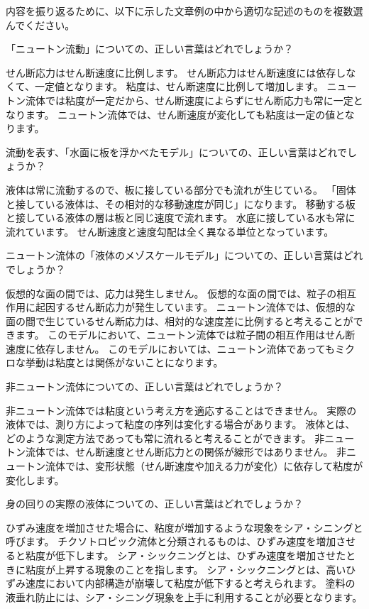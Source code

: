 \documentclass[uplatex,dvipdfmx,a4paper,11pt]{jsreport}
\begin{document}
内容を振り返るために、以下に示した文章例の中から適切な記述のものを複数選んでください。
\begin{qlist}
	\qitem 「ニュートン流動」についての、正しい言葉はどれでしょうか？
		\begin{qlist2}
			\qitem せん断応力はせん断速度に比例します。
			\qitem せん断応力はせん断速度には依存しなくて、一定値となります。
			\qitem 粘度は、せん断速度に比例して増加します。
			\qitem ニュートン流体では粘度が一定だから、せん断速度によらずにせん断応力も常に一定となります。
			\qitem ニュートン流体では、せん断速度が変化しても粘度は一定の値となります。
		\end{qlist2}
	\qitem 流動を表す、「水面に板を浮かべたモデル」についての、正しい言葉はどれでしょうか？
		\begin{qlist2}
			\qitem 液体は常に流動するので、板に接している部分でも流れが生じている。
			\qitem 「固体と接している液体は、その相対的な移動速度が同じ」になります。
			\qitem 移動する板と接している液体の層は板と同じ速度で流れます。
			\qitem 水底に接している水も常に流れています。
			\qitem せん断速度と速度勾配は全く異なる単位となっています。
		\end{qlist2}
	\qitem ニュートン流体の「液体のメゾスケールモデル」についての、正しい言葉はどれでしょうか？
		\begin{qlist2}
			\qitem 仮想的な面の間では、応力は発生しません。
			\qitem 仮想的な面の間では、粒子の相互作用に起因するせん断応力が発生しています。
			\qitem ニュートン流体では、仮想的な面の間で生じているせん断応力は、相対的な速度差に比例すると考えることができます。
			\qitem このモデルにおいて、ニュートン流体では粒子間の相互作用はせん断速度に依存しません。
			\qitem このモデルにおいては、ニュートン流体であってもミクロな挙動は粘度とは関係がないことになります。
		\end{qlist2}
	\qitem 非ニュートン流体についての、正しい言葉はどれでしょうか？
		\begin{qlist2}
			\qitem 非ニュートン流体では粘度という考え方を適応することはできません。
			\qitem 実際の液体では、測り方によって粘度の序列は変化する場合があります。
			\qitem 液体とは、どのような測定方法であっても常に流れると考えることができます。
			\qitem 非ニュートン流体では、せん断速度とせん断応力との関係が線形ではありません。
			\qitem 非ニュートン流体では、変形状態（せん断速度や加える力が変化）に依存して粘度が変化します。
		\end{qlist2}
	\qitem 身の回りの実際の液体についての、正しい言葉はどれでしょうか？
		\begin{qlist2}
			\qitem ひずみ速度を増加させた場合に、粘度が増加するような現象をシア・シニングと呼びます。
			\qitem チクソトロピック流体と分類されるものは、ひずみ速度を増加させると粘度が低下します。
			\qitem シア・シックニングとは、ひずみ速度を増加させたときに粘度が上昇する現象のことを指します。
			\qitem シア・シックニングとは、高いひずみ速度において内部構造が崩壊して粘度が低下すると考えられます。
			\qitem 塗料の液垂れ防止には、シア・シニング現象を上手に利用することが必要となります。
		\end{qlist2}
\end{qlist}
\end{document}
